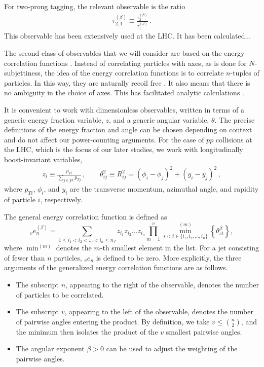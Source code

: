 \documentclass[11pt,letterpaper]{article}
\DeclareRobustCommand{\Ref}[1]{Ref.~\cite{#1}}
\newcommand{\ecfvar}[3]{{_{#1}e_{#2}^{(#3)}}}
\newcommand{\ecfvarnobeta}[2]{{_{#1}e_{#2}}}
\newcommand{\Nsub}[2]{\tau_{#1}^{(#2)}}
\begin{document}
For two-prong tagging, the relevant observable is the ratio \cite{Thaler:2010tr}
\begin{align}
\Nsub{2,1}{\beta}\equiv \frac{\Nsub{2}{\beta}}{\Nsub{1}{\beta}}\,.
\end{align}
This observable has been extensively used at the LHC. It has been calculated...

The second class of observables that we will consider are based on the energy correlation functions \cite{Larkoski:2013eya}. Instead of correlating particles with axes, as is done for $N$-subjettiness, the idea of the energy correlation functions is to correlate $n$-tuples of particles. In this way, they are naturally recoil free \cite{Catani:1992jc,Dokshitzer:1998kz,Banfi:2004yd,Larkoski:2013eya,Larkoski:2014uqa}. It also means that there is no ambiguity in the choice of axes. This has facilitated analytic calculations \cite{Larkoski:2015kga}.


It is convenient to work with dimensionless observables, written in terms of a generic energy fraction variable, $z$, and a generic angular variable, $\theta$. The precise definitions of the energy fraction and angle can be chosen depending on context and do not affect our power-counting arguments. For the case of $pp$ collisions at the LHC, which is the focus of our later studies, we work with longitudinally boost-invariant variables,
\begin{align}\label{eq:ptratio}  
z_i\equiv\frac{p_{Ti}}{\sum_{j \in \text{jet}} p_{Tj}}\,, \qquad  \theta_{ij}^2\equiv R_{ij}^2 = (\phi_i-\phi_j)^2+(y_i-y_j)^2\,,
\end{align}
where $p_{Ti}$, $\phi_i$, and $y_i$ are the transverse momentum, azimuthal angle, and rapidity of particle $i$, respectively. 



The general energy correlation function is defined as
\begin{equation}\label{eq:ecf_gen}
\ecfvar{v}{n}{\beta} = \sum_{1 \leq i_1 < i_2 < \dots < i_n \leq n_J} z_{i_1} z_{i_2} \dots z_{i_n} \prod_{m = 1}^{v} \min^{(m)}_{s < t \in \{i_1, i_2 , \dots, i_n \}} \left\{ \theta_{st}^{\beta} \right\},
\end{equation}
where $\min^{(m)}$ denotes the $m$-th smallest element in the list.  For a jet consisting of fewer than $n$ particles, $\ecfvarnobeta{v}{n}$ is defined to be zero.  More explicitly, the three arguments of the generalized energy correlation functions are as follows.
\begin{itemize}
\item The subscript $n$, appearing to the right of the observable, denotes the number of particles to be correlated.   
\item The subscript $v$, appearing to the left of the observable, denotes the number of pairwise angles entering the product.  By definition, we take $v \leq \binom{n}{2}$, and the minimum then isolates the product of the $v$ smallest pairwise angles.
\item The angular exponent $\beta>0$ can be used to adjust the weighting of the pairwise angles.
\end{itemize}
\end{document}
